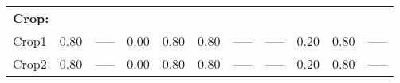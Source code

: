 \begin{landscape}
\begin{table}[htbp]
\begin{tabular}{lcccccccccc}
      \multicolumn{11}{l}{\textbf{Crop:}}  \\
      Crop1                                 & 0.80                 & -----                & 0.00                 & 0.80               & 0.80                & -----                     & -----                   & 0.20                & 0.80              & -----                     \\
      Crop2                                 & 0.80                 & -----                & 0.00                 & 0.80               & 0.80                & -----                     & -----                   & 0.20                & 0.80              & -----                     \\ \bottomrule
    \end{tabular}
  \end{table}
\end{landscape}

